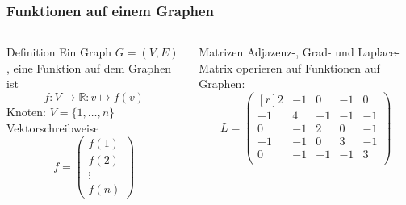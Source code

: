 %
%
%
\bgroup
\def\knoten#1#2{
	\draw #1 circle[radius=0.25];
	\node at #1 {$#2$};
}
\def\kante#1#2{
	\draw[shorten >= 0.25cm,shorten <= 0.25cm] #1 -- #2;
}
\begin{frame}[t]
\setlength{\abovedisplayskip}{5pt}
\setlength{\belowdisplayskip}{5pt}
\frametitle{Funktionen auf einem Graphen}
\vspace{-20pt}
\begin{columns}[t,onlytextwidth]
\begin{column}{0.48\textwidth}
\begin{block}{Definition}
Ein Graph $G=(V,E)$, eine Funktion auf dem Graphen ist
\[
f\colon V \to \mathbb{R} : v\mapsto f(v)
\]
Knoten: $V=\{1,\dots,n\}$
\\
Vektorschreibweise
\[
f = \begin{pmatrix}
f(1)\\f(2)\\\vdots\\f(n)
\end{pmatrix}
\]
\end{block}
\end{column}
\begin{column}{0.48\textwidth}
\begin{block}{Matrizen}
Adjazenz-, Grad- und Laplace-Matrix operieren auf Funktionen auf Graphen:
\[
L
=
\begin{pmatrix*}[r]
 2&-1& 0&-1& 0\\
-1& 4&-1&-1&-1\\
 0&-1& 2& 0&-1\\
-1&-1& 0& 3&-1\\
 0&-1&-1&-1& 3\\
\end{pmatrix*}
\]
\end{block}
\begin{center}
\end{center}
\end{column}
\end{columns}
\end{frame}
\egroup
